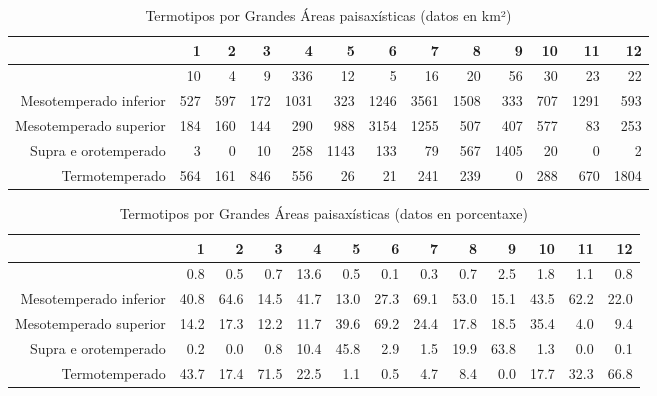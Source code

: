 \begin{table}[p]
\centering
\caption{Termotipos por Grandes Áreas paisaxísticas (datos en km²)} 
\label{xtaboa3}
\begin{tabular}{rrrrrrrrrrrrr}
  \hline
 & 1 & 2 & 3 & 4 & 5 & 6 & 7 & 8 & 9 & 10 & 11 & 12 \\ 
  \hline
 & 10 & 4 & 9 & 336 & 12 & 5 & 16 & 20 & 56 & 30 & 23 & 22 \\ 
  Mesotemperado inferior & 527 & 597 & 172 & 1031 & 323 & 1246 & 3561 & 1508 & 333 & 707 & 1291 & 593 \\ 
  Mesotemperado superior & 184 & 160 & 144 & 290 & 988 & 3154 & 1255 & 507 & 407 & 577 & 83 & 253 \\ 
  Supra e orotemperado & 3 & 0 & 10 & 258 & 1143 & 133 & 79 & 567 & 1405 & 20 & 0 & 2 \\ 
  Termotemperado & 564 & 161 & 846 & 556 & 26 & 21 & 241 & 239 & 0 & 288 & 670 & 1804 \\ 
   \hline
\end{tabular}
\end{table}
\begin{table}[p]
\centering
\caption{Termotipos por Grandes Áreas paisaxísticas (datos en porcentaxe)} 
\label{xtaboa3p}
\begin{tabular}{rrrrrrrrrrrrr}
  \hline
 & 1 & 2 & 3 & 4 & 5 & 6 & 7 & 8 & 9 & 10 & 11 & 12 \\ 
  \hline
 & 0.8 & 0.5 & 0.7 & 13.6 & 0.5 & 0.1 & 0.3 & 0.7 & 2.5 & 1.8 & 1.1 & 0.8 \\ 
  Mesotemperado inferior & 40.8 & 64.6 & 14.5 & 41.7 & 13.0 & 27.3 & 69.1 & 53.0 & 15.1 & 43.5 & 62.2 & 22.0 \\ 
  Mesotemperado superior & 14.2 & 17.3 & 12.2 & 11.7 & 39.6 & 69.2 & 24.4 & 17.8 & 18.5 & 35.4 & 4.0 & 9.4 \\ 
  Supra e orotemperado & 0.2 & 0.0 & 0.8 & 10.4 & 45.8 & 2.9 & 1.5 & 19.9 & 63.8 & 1.3 & 0.0 & 0.1 \\ 
  Termotemperado & 43.7 & 17.4 & 71.5 & 22.5 & 1.1 & 0.5 & 4.7 & 8.4 & 0.0 & 17.7 & 32.3 & 66.8 \\ 
   \hline
\end{tabular}
\end{table}
